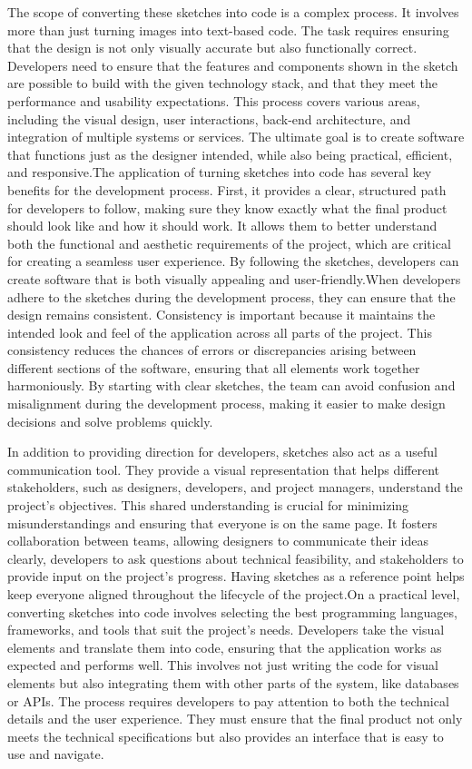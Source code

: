     The scope of converting these sketches into code is a complex process. It involves more than just turning images into text-based code. The task requires ensuring that the design is not only visually accurate but also functionally correct. Developers need to ensure that the features and components shown in the sketch are possible to build with the given technology stack, and that they meet the performance and usability expectations. This process covers various areas, including the visual design, user interactions, back-end architecture, and integration of multiple systems or services. The ultimate goal is to create software that functions just as the designer intended, while also being practical, efficient, and responsive.The application of turning sketches into code has several key benefits for the development process. First, it provides a clear, structured path for developers to follow, making sure they know exactly what the final product should look like and how it should work. It allows them to better understand both the functional and aesthetic requirements of the project, which are critical for creating a seamless user experience. By following the sketches, developers can create software that is both visually appealing and user-friendly.When developers adhere to the sketches during the development process, they can ensure that the design remains consistent. Consistency is important because it maintains the intended look and feel of the application across all parts of the project. This consistency reduces the chances of errors or discrepancies arising between different sections of the software, ensuring that all elements work together harmoniously. By starting with clear sketches, the team can avoid confusion and misalignment during the development process, making it easier to make design decisions and solve problems quickly.
    
    In addition to providing direction for developers, sketches also act as a useful communication tool. They provide a visual representation that helps different stakeholders, such as designers, developers, and project managers, understand the project’s objectives. This shared understanding is crucial for minimizing misunderstandings and ensuring that everyone is on the same page. It fosters collaboration between teams, allowing designers to communicate their ideas clearly, developers to ask questions about technical feasibility, and stakeholders to provide input on the project’s progress. Having sketches as a reference point helps keep everyone aligned throughout the lifecycle of the project.On a practical level, converting sketches into code involves selecting the best programming languages, frameworks, and tools that suit the project’s needs. Developers take the visual elements and translate them into code, ensuring that the application works as expected and performs well. This involves not just writing the code for visual elements but also integrating them with other parts of the system, like databases or APIs. The process requires developers to pay attention to both the technical details and the user experience. They must ensure that the final product not only meets the technical specifications but also provides an interface that is easy to use and navigate.
    

